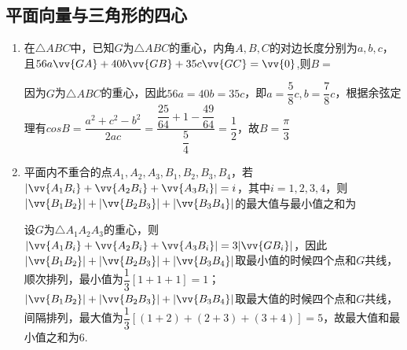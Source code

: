 \subsection*{平面向量与三角形的四心}
\begin{enumerate}
    \item 在$\triangle ABC$中，已知$G$为$\triangle ABC$的重心，内角$A,B,C$的对边长度分别为$a, b, c$，且$56a \vv{GA} + 40b \vv{GB} + 35c\vv{GC} = \vv{0}$,则$B = $
    \begin{jieda}
        因为$G$为$\triangle ABC$的重心，因此$56a = 40 b = 35c$，即$a = \dfrac{5}{8}c, b = \dfrac{7}{8}c$，根据余弦定理有$cosB = \dfrac{a^2 + c^2 - b^2}{2ac} = \dfrac{\dfrac{25}{64} + 1 - \dfrac{49}{64}}{\dfrac{5}{4}} = \dfrac{1}{2}$，故$B = \dfrac{\pi}{3}$
    \end{jieda}
    \item 平面内不重合的点$A_1, A_2, A_3, B_1, B_2, B_3, B_4$，若$|\vv{A_1B_i} + \vv{A_2B_i} + \vv{A_3B_i}| = i$，其中$i = 1, 2, 3, 4$，则$|\vv{B_1B_2}| + |\vv{B_2B_3}| + |\vv{B_3B_4}|$的最大值与最小值之和为
    \begin{jieda}
        设$G$为$\triangle A_1A_2A_3$的重心，则$|\vv{A_1B_i} + \vv{A_2B_i} + \vv{A_3B_i}| = 3|\vv{GB_i}|$，因此$|\vv{B_1B_2}| + |\vv{B_2B_3}| + |\vv{B_3B_4}|$取最小值的时候四个点和$G$共线，顺次排列，最小值为$\dfrac{1}{3}[1+1+1] = 1$；$|\vv{B_1B_2}| + |\vv{B_2B_3}| + |\vv{B_3B_4}|$取最大值的时候四个点和$G$共线，间隔排列，最大值为$\dfrac{1}{3}[(1+2)+(2+3)+(3+4)] = 5$，故最大值和最小值之和为6.
    \end{jieda}


\end{enumerate}
